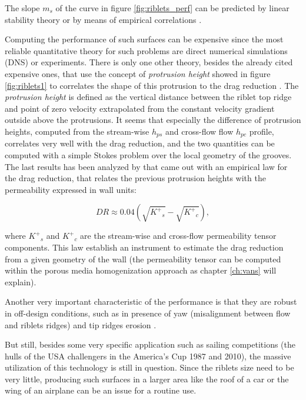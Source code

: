 The slope $m_s$ of the curve in figure \ref{fig:riblets_perf} can be predicted by linear stability theory or by means of empirical correlations \citet{garcia2011hydrodynamic}.

Computing the performance of such surfaces can be expensive since the most reliable quantitative theory for such problems are direct numerical simulations (DNS) or experiments.
There is only one other theory, besides the already cited expensive ones, that use the concept of \textit{protrusion height} showed in figure \ref{fig:riblets1} to correlates the shape of this protrusion to the drag reduction \citet{luchini1991resistance}.
The \textit{protrusion height} is defined as the vertical distance between the riblet top ridge and point of zero velocity extrapolated from the constant velocity gradient outside above the protrusions.
It seems that especially the difference of protrusion heights, computed from the stream-wise $h_{ps}$ and cross-flow flow $h_{pc}$ profile, correlates very well with the drag reduction, and the two quantities can be computed with a simple Stokes problem over the local geometry of the grooves.
The last results has been analyzed by \citet{segura2017permeable} that came out with an empirical law for the drag reduction, that relates the previous protrusion heights with the permeability expressed in wall units:

\begin{equation}
DR \approx 0.04\left( \sqrt{{K^+}_s} - \sqrt{{K^+}_c} \right),
\label{eq:max_dr}
\end{equation}

where ${K^+}_s$ and ${K^+}_c$ are the stream-wise and cross-flow permeability tensor components.
This law establish an instrument to estimate the drag reduction from a given geometry of the wall (the permeability tensor can be computed within the porous media homogenization approach as chapter \ref{ch:vans} will explain).

Another very important characteristic of the performance is that they are robust in off-design conditions, such as in presence of yaw (misalignment between flow and riblets ridges) and tip ridges erosion \citet{garcia2011drag}.

But still, besides some very specific application such as sailing competitions (the hulls of the USA challengers in the America’s Cup 1987 and 2010), the massive utilization of this technology is still in question.
Since the riblets size need to be very little, producing such surfaces in a larger area like the roof of a car or the wing of an airplane can be an issue for a routine use.

